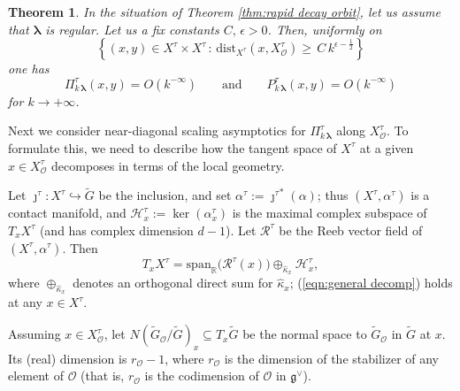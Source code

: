 \documentclass[12pt,a4paper]{article}
\theoremstyle{plain}
\newtheorem{thm}{Theorem}[section]
\theoremstyle{definition}
\begin{document}
\begin{thm}
\label{thm:rapid decay moment map}
In the situation of Theorem \ref{thm:rapid decay orbit},
let us assume
that $\boldsymbol{\lambda}$ is regular.
Let us a fix constants $C,\,\epsilon>0$. Then, uniformly on
\begin{equation}
\label{eqn:bound distance momentO}
\left\{
(x,y)\in X^\tau\times X^\tau\,:\,\mathrm{dist}_{X^\tau}
\left(x,X^\tau_{\mathcal{O}}\right)
%
\ge \,C\,k^{\epsilon-\frac{1}{2}}\right\}
\end{equation}
%
one has
$$
\Pi^\tau_{k\,\boldsymbol{\lambda}}(x,y)=
O\left(k^{-\infty}\right)\qquad
\text{and}\qquad P^\tau_{k\,\boldsymbol{\lambda}}(x,y)=
O\left(k^{-\infty}\right)
$$
for $k\rightarrow +\infty$.

\end{thm}




Next we consider near-diagonal scaling asymptotics 
for $\Pi^\tau_{k\,\boldsymbol{\lambda}}$ along $X^\tau_{\mathcal{O}}$.
To formulate this, we need to describe how 
the tangent space of $X^\tau$ at a given $x\in X^\tau_{\mathcal{O}}$
decomposes in terms of the local
geometry. 

Let $\jmath^\tau:X^\tau\hookrightarrow \tilde{G}$ be the inclusion,
and set $\alpha^\tau:={\jmath^\tau}^*(\alpha)$; thus 
$(X^\tau,\alpha^\tau)$ is a contact manifold, and $\mathcal{H}_x^\tau:= \ker(\alpha^\tau_x)$ is the
maximal complex subspace of $T_xX^\tau$
(and has complex dimension $d-1$).
Let $\mathcal{R}^\tau$ be the Reeb vector field of 
$(X^\tau,\alpha^\tau)$.
Then
\begin{equation}
\label{eqn:general decomp}
T_xX^\tau=\mathrm{span}_{\mathbb{R}}\big(\mathcal{R}^\tau(x)\big)
\oplus_{\hat{\kappa}_x} \mathcal{H}_x^\tau,
\end{equation}
where $\oplus_{\hat{\kappa}_x}$ denotes an orthogonal direct sum for
$\hat{\kappa}_x$; (\ref{eqn:general decomp}) holds at any $x\in X^\tau$.

Assuming $x\in X^\tau_{\mathcal{O}}$, let 
$N(\tilde{G}_{\mathcal{O}}/\tilde{G})_x\subseteq T_x\tilde{G}$ be the normal 
space to $\tilde{G}_{\mathcal{O}}$ in $\tilde{G}$ at $x$.
Its (real) dimension is $r_{\mathcal{O}}-1$, where 
$r_{\mathcal{O}}$ is the dimension of the stabilizer of any
element of $\mathcal{O}$ (that is, $r_{\mathcal{O}}$
is the codimension of $\mathcal{O}$ in $\mathfrak{g}^\vee$).
\end{document}
